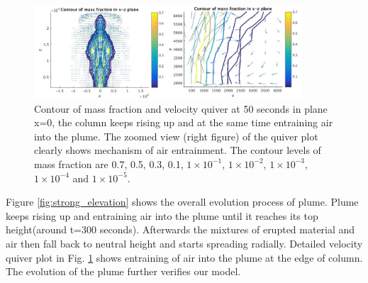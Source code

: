 \documentclass[journal abbreviation, manuscript]{copernicus}
\begin{document}

\begin{figure}
\includegraphics[width=10cm]{t50}
\caption{Contour of mass fraction and velocity quiver at 50 seconds in plane x=0, the column keeps rising up and at the same time entraining air into the plume. The zoomed view (right figure) of the quiver plot clearly shows mechanism of air entrainment. The contour levels of mass fraction are 0.7, 0.5, 0.3, 0.1, $1\times 10 ^{-1}$, $1\times 10 ^{-2}$, $1\times 10 ^{-3}$, $1\times 10^{-4}$ and $1\times 10^{-5}$.}
\label{fig:strong_plume_t50}
\end{figure}
Figure \ref{fig:strong_elevation} shows the overall evolution process of plume. Plume keeps rising up and entraining air into the plume until it reaches its top height(around t=300 seconds). Afterwards the mixtures of erupted material and air then fall back to neutral height and starts spreading radially. Detailed velocity quiver plot in Fig. \ref{fig:strong_plume_t50} shows entraining of air into the plume at the edge of column. The evolution of the plume further verifies our model.
\end{document}
